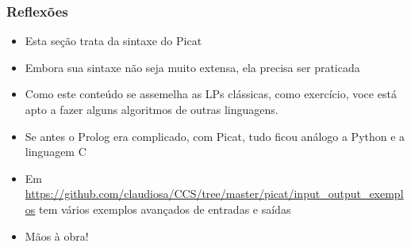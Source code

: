 \begin{frame}[fragile]
\frametitle{Reflexões}

\begin{itemize}


  \item Esta seção  trata da sintaxe do Picat
  
    \pause
  \item Embora sua sintaxe não seja muito extensa, ela precisa 
  ser praticada
  
    \pause
  \item Como este conteúdo se assemelha as LPs clássicas, como exercício,
  voce está apto a fazer alguns algoritmos de outras linguagens.

  \pause
  \item Se antes o Prolog era complicado, com Picat,
  tudo ficou análogo a Python e a linguagem C
  
  \pause
  \item Em \url{https://github.com/claudiosa/CCS/tree/master/picat/input_output_exemplos}
  tem vários exemplos avançados de entradas e saídas 
  
  \pause
  \item Mãos à obra!
 
\end{itemize}

\end{frame}
